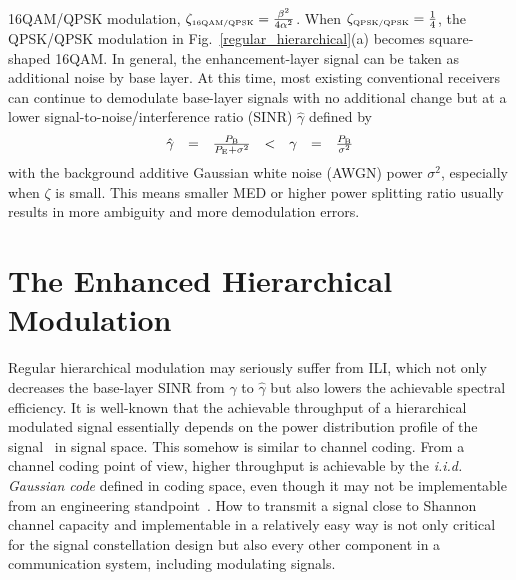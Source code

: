 \documentclass[conference]{IEEEtran}
\begin{document}
16QAM/QPSK modulation, $\zeta_{\mbox{\tiny 16QAM/QPSK}}=
\frac{\beta^{2}}{4\alpha^2}$. When $\zeta_{\mbox{\tiny
QPSK/QPSK}}=\frac{1}{4}$, the QPSK/QPSK modulation in
Fig.~\ref{regular_hierarchical}(a) becomes square-shaped 16QAM. In
general, the enhancement-layer signal can be taken as additional
noise by base layer. At this time, most existing conventional
receivers can continue to demodulate base-layer signals with no
additional change but at a lower signal-to-noise/interference
ratio (SINR) $\hat{\gamma}$ defined by
\begin{equation}
\begin{array}{rcccccl}
\hat{\gamma}& = & \frac{P_{\rm B}}{P_{\rm
E}+\sigma^2}&<&\gamma&=&\frac{P_{\rm B}}{\sigma^2}
\end{array}\label{SINR}
\end{equation}
\noindent with the background additive Gaussian white noise (AWGN)
power $\sigma^2$,  especially when $\zeta$ is small. This means
smaller MED or higher power splitting ratio usually results in
more ambiguity and more demodulation errors.

\section{The Enhanced Hierarchical Modulation}
\begin{figure}
\end{figure}

Regular hierarchical modulation may seriously suffer from ILI,
which not only decreases the base-layer SINR from ${\gamma}$ to
$\hat{\gamma}$ but also lowers the achievable spectral efficiency.
It is well-known that the achievable throughput of a hierarchical
modulated signal essentially depends on the power distribution
profile of the signal~\cite{Unge82} in signal space. This somehow
is similar to channel coding. From a channel coding point of view,
higher throughput is achievable by the {\em i.i.d. Gaussian code}
defined in coding space, even though it may not be implementable
from an engineering standpoint~\cite{Cover72}. How to transmit a
signal close to Shannon channel capacity and implementable in a
relatively easy way is not only critical for the signal
constellation design but also every other component in a
communication system, including modulating signals.
\end{document}
